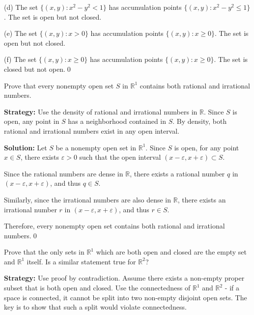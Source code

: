 (d) The set $\{(x,y) : x^2 - y^2 < 1\}$ has accumulation points $\{(x,y) : x^2 - y^2 \leq 1\}$. The set is open but not closed.

(e) The set $\{(x,y) : x > 0\}$ has accumulation points $\{(x,y) : x \geq 0\}$. The set is open but not closed.

(f) The set $\{(x,y) : x \geq 0\}$ has accumulation points $\{(x,y) : x \geq 0\}$. The set is closed but not open.\qed


\begin{problembox}
Prove that every nonempty open set $S$ in $\mathbb{R}^1$ contains both rational and irrational numbers.
\end{problembox}

\noindent\textbf{Strategy:} Use the density of rational and irrational numbers in $\mathbb{R}$. Since $S$ is open, any point in $S$ has a neighborhood contained in $S$. By density, both rational and irrational numbers exist in any open interval.

\bigskip\noindent\textbf{Solution:} Let $S$ be a nonempty open set in $\mathbb{R}^1$. Since $S$ is open, for any point $x \in S$, there exists $\varepsilon > 0$ such that the open interval $(x-\varepsilon, x+\varepsilon) \subset S$.

Since the rational numbers are dense in $\mathbb{R}$, there exists a rational number $q$ in $(x-\varepsilon, x+\varepsilon)$, and thus $q \in S$.

Similarly, since the irrational numbers are also dense in $\mathbb{R}$, there exists an irrational number $r$ in $(x-\varepsilon, x+\varepsilon)$, and thus $r \in S$.

Therefore, every nonempty open set contains both rational and irrational numbers.\qed


\begin{problembox}
Prove that the only sets in $\mathbb{R}^1$ which are both open and closed are the empty set and $\mathbb{R}^1$ itself. Is a similar statement true for $\mathbb{R}^2$?
\end{problembox}

\noindent\textbf{Strategy:} Use proof by contradiction. Assume there exists a non-empty proper subset that is both open and closed. Use the connectedness of $\mathbb{R}^1$ and $\mathbb{R}^2$ - if a space is connected, it cannot be split into two non-empty disjoint open sets. The key is to show that such a split would violate connectedness.

